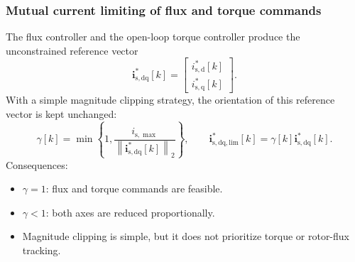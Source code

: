 \begin{frame}
    \frametitle{Mutual current limiting of flux and torque commands}
    The flux controller and the open-loop torque controller produce the unconstrained reference vector
    \begin{equation}
        \bm{i}^{*}_{\mathrm{s,dq}}[k]
        =\begin{bmatrix}
            i^{*}_{\mathrm{s,d}}[k] \\
            i^{*}_{\mathrm{s,q}}[k]
        \end{bmatrix} .
    \end{equation}\pause%
    With a simple magnitude clipping strategy, the orientation of this reference vector is kept unchanged:
    \begin{equation}
        \gamma[k]
        =\min\left\{1,\frac{i_{\mathrm{s},\max}}{\left\|\bm{i}^{*}_{\mathrm{s,dq}}[k]\right\|_2}\right\},
        \qquad
        \bm{i}^{*}_{\mathrm{s,dq,lim}}[k]
        =\gamma[k]\bm{i}^{*}_{\mathrm{s,dq}}[k].
        \label{eq:IM_flux_mutual_current_limit}
    \end{equation}\pause%
    Consequences:
    \begin{itemize}
        \item $\gamma=1$: flux and torque commands are feasible.\pause%
        \item $\gamma<1$: both axes are reduced proportionally.\pause%
        \item Magnitude clipping is simple, but it does not prioritize torque or rotor-flux tracking.
    \end{itemize}
\end{frame}

